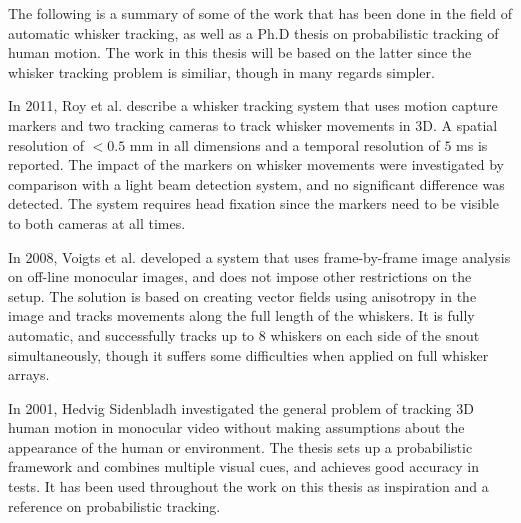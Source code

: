 The following is a summary of some of the work that has been done in
the field of automatic whisker tracking, as well as a Ph.D thesis on
probabilistic tracking of human motion. The work in this thesis will
be based on the latter since the whisker tracking problem is similiar,
though in many regards simpler.


In 2011, Roy et al. \cite{BadExample1} describe a whisker tracking
system that uses motion capture markers and two tracking cameras to
track whisker movements in 3D. A spatial resolution of $<0.5$ mm in
all dimensions and a temporal resolution of $5$ ms is reported. The
impact of the markers on whisker movements were investigated by
comparison with a light beam detection system, and no significant
difference was detected. The system requires head fixation since the
markers need to be visible to both cameras at all times.
        

In 2008, Voigts et al. \cite{UnsupervisedTracking} developed a system
that uses frame-by-frame image analysis on off-line monocular images,
and does not impose other restrictions on the setup. The solution is
based on creating vector fields using anisotropy in the image and
tracks movements along the full length of the whiskers. It is fully
automatic, and successfully tracks up to 8 whiskers on each side of
the snout simultaneously, though it suffers some difficulties when
applied on full whisker arrays.


In 2001, Hedvig Sidenbladh \cite{Hedvig} investigated the general
problem of tracking 3D human motion in monocular video without making
assumptions about the appearance of the human or environment. The
thesis sets up a probabilistic framework and combines multiple visual
cues, and achieves good accuracy in tests. It has been used throughout
the work on this thesis as inspiration and a reference on
probabilistic tracking.
